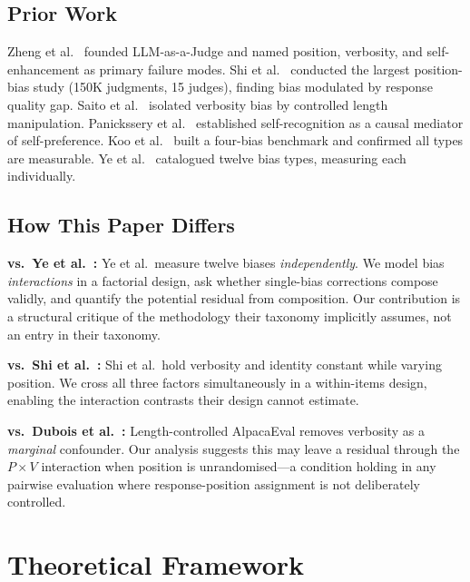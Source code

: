 \documentclass[10pt,conference]{IEEEtran}
\begin{document}
\subsection{Prior Work}

Zheng et al.~\cite{zheng2023judging} founded LLM-as-a-Judge
and named position, verbosity, and self-enhancement as
primary failure modes.
Shi et al.~\cite{shi2024position} conducted the largest
position-bias study (150K judgments, 15 judges), finding
bias modulated by response quality gap.
Saito et al.~\cite{saito2023verbosity} isolated verbosity
bias by controlled length manipulation.
Panickssery et al.~\cite{panickssery2024llm} established
self-recognition as a causal mediator of self-preference.
Koo et al.~\cite{koo2023benchmarking} built a four-bias
benchmark and confirmed all types are measurable.
Ye et al.~\cite{ye2024justice} catalogued twelve bias
types, measuring each individually.

\subsection{How This Paper Differs}

\textbf{vs.\ Ye et al.~\cite{ye2024justice}:}
Ye et al.\ measure twelve biases \textit{independently}.
We model bias \textit{interactions} in a factorial design,
ask whether single-bias corrections compose validly, and
quantify the potential residual from composition.
Our contribution is a structural critique of the methodology
their taxonomy implicitly assumes, not an entry in their taxonomy.

\textbf{vs.\ Shi et al.~\cite{shi2024position}:}
Shi et al.\ hold verbosity and identity constant while
varying position.
We cross all three factors simultaneously in a within-items
design, enabling the interaction contrasts their design
cannot estimate.

\textbf{vs.\ Dubois et al.~\cite{dubois2024length}:}
Length-controlled AlpacaEval removes verbosity as a
\textit{marginal} confounder.
Our analysis suggests this may leave a residual through the
$P{\times}V$ interaction when position is unrandomised---a
condition holding in any pairwise evaluation where
response-position assignment is not deliberately controlled.

\section{Theoretical Framework}
\label{sec:theory}
\end{document}
